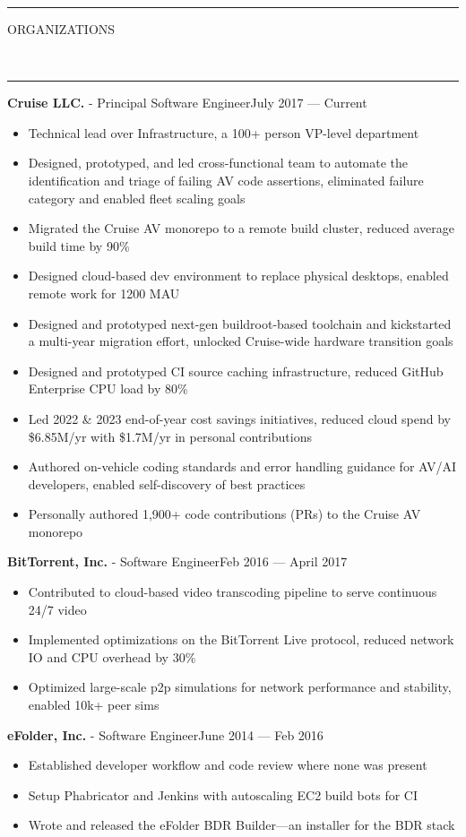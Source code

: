 \documentclass[10pt, letterpaper, oneside]{article}
\newcommand{\HRule}[2]{\textcolor{#1}{\rule{\linewidth}{#2}}}
\newcommand{\sectiontitle}[1]{\begin{minipage}{\textwidth}\HRule{black}{0.25mm}\vspace{-10pt}\begin{center}\Large\MakeUppercase{#1}\end{center}\end{minipage}\\\HRule{light-grey}{0.15mm}\vspace{\baselineskip}}
\newenvironment{tightressection}[1]{
  \begin{minipage}{\textwidth}
  \sectiontitle{#1}}
  {\vspace{2\baselineskip}\end{minipage}}
\newcommand{\resitem}[1]{
    \vspace{2pt}
    \item \begin{flushleft} #1 \end{flushleft}
}
\newcommand{\resentryheader}[3]{
    \vspace{-5pt}
    \textbf{#1} - #2\hspace{\stretch{1}}\textcolor{light-grey}{#3}\\
}
\newenvironment{resentry}[3]{
  \begin{minipage}{\textwidth}
    \resentryheader{#1}{#2}{#3}
        \vspace{-\baselineskip}
    \begin{itemize}[noitemsep,nolistsep]
}{
    \end{itemize}
        \vspace{\baselineskip}
        \end{minipage}
}
\begin{document}
\begin{tightressection}{Organizations}
  \begin{resentry}{Cruise LLC.}{Principal Software Engineer}{July 2017 --- Current}
    \resitem{Technical lead over Infrastructure, a 100+ person VP-level department}
    \resitem{Designed, prototyped, and led cross-functional team to automate the identification and triage of failing AV code assertions, eliminated failure category and enabled fleet scaling goals}
    \resitem{Migrated the Cruise AV monorepo to a remote build cluster, reduced average build time by 90\%}
    \resitem{Designed cloud-based dev environment to replace physical desktops, enabled remote work for 1200 MAU}
    \resitem{Designed and prototyped next-gen buildroot-based toolchain and kickstarted a multi-year migration effort, unlocked Cruise-wide hardware transition goals}
    \resitem{Designed and prototyped CI source caching infrastructure, reduced GitHub Enterprise CPU load by 80\%}
    \resitem{Led 2022 \& 2023 end-of-year cost savings initiatives, reduced cloud spend by \$6.85M/yr with \$1.7M/yr in personal contributions}
    \resitem{Authored on-vehicle coding standards and error handling guidance for AV/AI developers, enabled self-discovery of best practices}
    \resitem{Personally authored 1,900+ code contributions (PRs) to the Cruise AV monorepo}
  \end{resentry}
  \begin{resentry}{BitTorrent, Inc.}{Software Engineer}{Feb 2016 --- April 2017}
    \resitem{Contributed to cloud-based video transcoding pipeline to serve continuous 24/7 video}
    \resitem{Implemented optimizations on the BitTorrent Live protocol, reduced network IO and CPU overhead by 30\%}
    \resitem{Optimized large-scale p2p simulations for network performance and stability, enabled 10k+ peer sims}
  \end{resentry}
  \begin{resentry}{eFolder, Inc.}{Software Engineer}{June 2014 --- Feb 2016}
    \resitem{Established developer workflow and code review where none was present}
    \resitem{Setup Phabricator and Jenkins with autoscaling EC2 build bots for CI}
    \resitem{Wrote and released the eFolder BDR Builder---an installer for the BDR stack}
  \end{resentry}
\end{tightressection}
\end{document}
